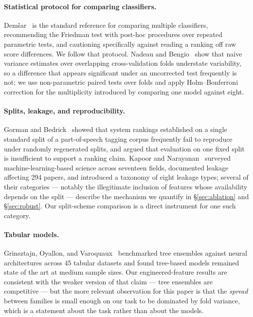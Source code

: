 \documentclass[11pt]{article}                      %
\begin{document}
\paragraph{Statistical protocol for comparing classifiers.}
Dem\v{s}ar~\cite{demsar2006statistical} is the standard reference for comparing
multiple classifiers, recommending the Friedman test with post-hoc procedures
over repeated parametric tests, and cautioning specifically against reading a
ranking off raw score differences. We follow that protocol. Nadeau and
Bengio~\cite{nadeau2003inference} show that naive variance estimates over
overlapping cross-validation folds understate variability, so a difference that
appears significant under an uncorrected test frequently is not; we use
non-parametric paired tests over folds and apply Holm--Bonferroni correction for
the multiplicity introduced by comparing one model against eight.

\paragraph{Splits, leakage, and reproducibility.}
Gorman and Bedrick~\cite{gorman2019splits} showed that system rankings
established on a single standard split of a part-of-speech tagging corpus
frequently fail to reproduce under randomly regenerated splits, and argued that
evaluation on one fixed split is insufficient to support a ranking claim. Kapoor
and Narayanan~\cite{kapoor2023leakage} surveyed machine-learning-based science
across seventeen fields, documented leakage affecting 294 papers, and introduced
a taxonomy of eight leakage types; several of their categories --- notably the
illegitimate inclusion of features whose availability depends on the split ---
describe the mechanism we quantify in \S\ref{sec:ablation} and
\S\ref{sec:robust}. Our split-scheme comparison is a direct instrument for one
such category.

\paragraph{Tabular models.}
Grinsztajn, Oyallon, and Varoquaux~\cite{grinsztajn2022tabular} benchmarked tree
ensembles against neural architectures across 45 tabular datasets and found
tree-based models remained state of the art at medium sample sizes. Our
engineered-feature results are consistent with the weaker version of that claim
--- tree ensembles are competitive --- but the more relevant observation for this
paper is that the \emph{spread} between families is small enough on our task to
be dominated by fold variance, which is a statement about the task rather than
about the models.
\end{document}
